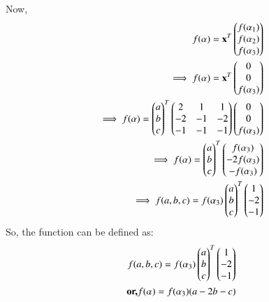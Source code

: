 \documentclass[journal,12pt,twocolumn]{IEEEtran}
\renewcommand\thesection{\arabic{section}}
\begin{document}
Now,
\begin{align}
f(\alpha) = \mathbf{x}^T \begin{pmatrix}f(\alpha_1)\\f(\alpha_2)\\f(\alpha_3)\end{pmatrix}\\
\implies f(\alpha) =  \mathbf{x}^T \begin{pmatrix}0\\0\\f(\alpha_3)\end{pmatrix}\\
\implies f(\alpha) = \begin{pmatrix}a\\b\\c\end{pmatrix}^T \begin{pmatrix}2 & 1 & 1\\-2 & -1 & -2\\-1 & -1 & -1\end{pmatrix} \begin{pmatrix}0\\0\\f(\alpha_3)\end{pmatrix}\\
\implies f(\alpha) = \begin{pmatrix}a\\b\\c\end{pmatrix}^T \begin{pmatrix}f(\alpha_3)\\-2f(\alpha_3)\\-f(\alpha_3)\end{pmatrix}\\
\implies f(a,b,c) = f(\alpha_3) \begin{pmatrix}a\\b\\c\end{pmatrix}^T \begin{pmatrix}1\\-2\\-1\end{pmatrix}
\end{align}
So, the function can be defined as:
\begin{align}
f(a,b,c) = f(\alpha_3) \begin{pmatrix}a\\b\\c\end{pmatrix}^T \begin{pmatrix}1\\-2\\-1\end{pmatrix}\\
\textbf{or,} f(\mathbf{\alpha}) = f(\alpha_3) (a-2b-c)
\end{align}
\end{document}
